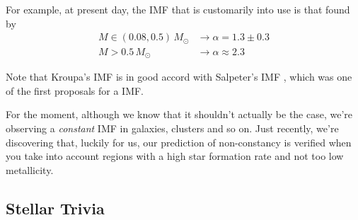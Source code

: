 \par For example, at present day, the IMF that is customarily into use is that found by \cite{2013pss5.book..115K}
\begin{align}
	M\in (0.08, 0.5)\,M_{\odot} & \to \alpha = 1.3 \pm 0.3\\
	M > 0.5\,M_{\odot} & \to \alpha \approx 2.3
	\label{eq:kroupaimf}
\end{align}
\par Note that Kroupa's IMF is in good accord with Salpeter's IMF \cite{1955ApJ...121..161S}, which was one of the first proposals for a IMF.
\par For the moment, although we know that it shouldn't actually be the case, we're observing a \emph{constant} IMF in galaxies, clusters and so on. Just recently, we're discovering that, luckily for us, our prediction of non-constancy is verified when you take into account regions with a high star formation rate and not too low metallicity.

\subsection{Stellar Trivia}

